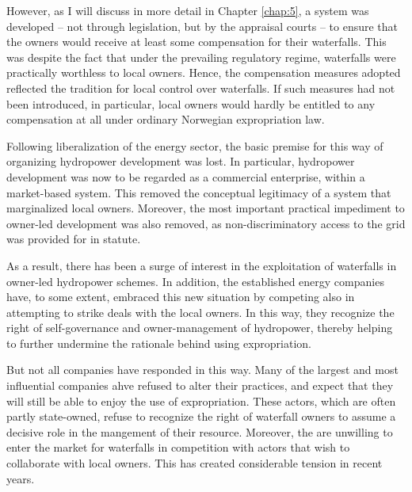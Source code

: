 However, as I will discuss in more detail in Chapter \ref{chap:5}, a system was developed -- not through legislation, but by the appraisal courts -- to ensure that the owners would receive at least some compensation for their waterfalls. This was despite the fact that under the prevailing regulatory regime, waterfalls were practically worthless to local owners. Hence, the compensation measures adopted reflected the tradition for local control over waterfalls. If such measures had not been introduced, in particular, local owners would hardly be entitled to any compensation at all under ordinary Norwegian expropriation law.

Following liberalization of the energy sector, the basic premise for this way of organizing hydropower development was lost. In particular, hydropower development was now to be regarded as a commercial enterprise, within a market-based system. This removed the conceptual legitimacy of a system that marginalized local owners. Moreover, the most important practical impediment to owner-led development was also removed, as non-discriminatory access to the grid was provided for in statute. 

As a result, there has been a surge of interest in the exploitation of waterfalls in owner-led hydropower schemes. In addition, the established energy companies have, to some extent, embraced this new situation by competing also in attempting to strike deals with the local owners. In this way, they recognize the right of self-governance and owner-management of hydropower, thereby helping to further undermine the rationale behind using expropriation. 

But not all companies have responded in this way. Many of the largest and most influential companies ahve refused to alter their practices, and expect that they will still be able to enjoy the use of expropriation. These actors, which are often partly state-owned, refuse to recognize the right of waterfall owners to assume a decisive role in the mangement of their resource. Moreover, the are unwilling to enter the market for waterfalls in competition with actors that wish to collaborate with local owners. This has created considerable tension in recent years. 

